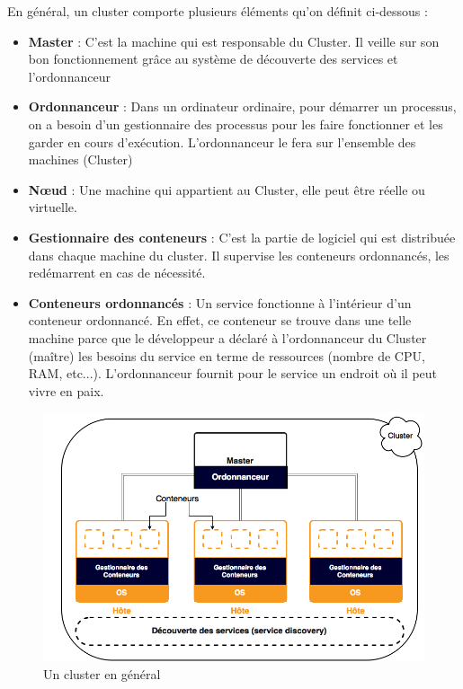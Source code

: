 \begin{onehalfspace}
En général, un cluster comporte plusieurs éléments qu'on définit ci-dessous :

\begin{itemize}
	\item \textbf{Master} : C'est la machine qui est responsable du Cluster. Il veille sur son bon fonctionnement grâce au système de découverte des services et l'ordonnanceur
	\item \textbf{Ordonnanceur} : Dans un ordinateur ordinaire, pour démarrer un processus, on a besoin d'un gestionnaire des processus pour les faire fonctionner et les garder en cours d'exécution. L'ordonnanceur le fera sur l'ensemble des machines (Cluster)
	\item \textbf{Nœud} : Une machine qui appartient au Cluster, elle peut être réelle ou virtuelle.
	\item \textbf{Gestionnaire des conteneurs} : C'est la partie de logiciel qui est distribuée dans chaque machine du cluster. Il supervise les conteneurs ordonnancés, les redémarrent en cas de nécessité.
	\item \textbf{Conteneurs ordonnancés} : Un service fonctionne à l'intérieur d'un conteneur ordonnancé. En effet, ce conteneur se trouve dans une telle machine  parce que le développeur a déclaré à l'ordonnanceur du Cluster (maître) les besoins du service en terme de ressources (nombre de CPU, RAM, etc...). L'ordonnanceur fournit pour le service un endroit où il peut vivre en paix.
\end{itemize}


\begin{figure}[H]
\centering
\includegraphics [scale=0.55]{chapitre3/assets/cluster}
\caption{Un cluster en général}
\label{fig:}
\end{figure}


\end{onehalfspace}
